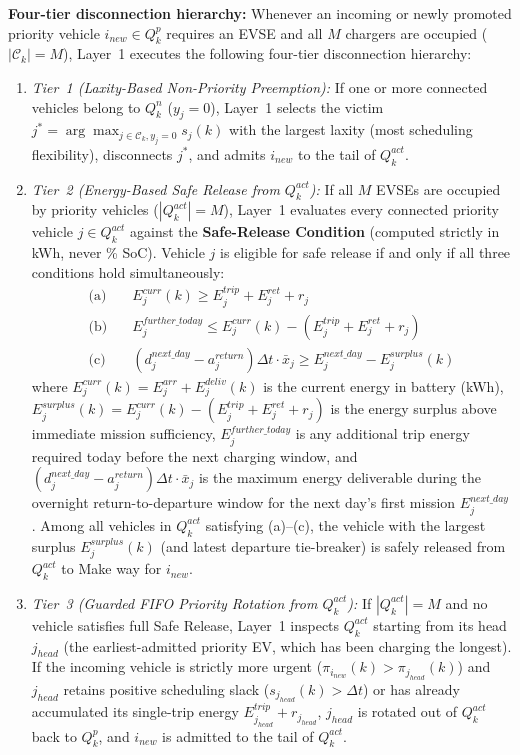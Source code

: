\documentclass[final,3p,times,twocolumn]{elsarticle}
\begin{document}
\textbf{Four-tier disconnection hierarchy:} Whenever an incoming or newly promoted priority vehicle $i_{new} \in Q_k^p$ requires an EVSE and all $M$ chargers are occupied ($|\mathcal{C}_k| = M$), Layer~1 executes the following four-tier disconnection hierarchy:
\begin{enumerate}
    \item \textit{Tier~1 (Laxity-Based Non-Priority Preemption):} If one or more connected vehicles belong to $Q_k^n$ ($y_j = 0$), Layer~1 selects the victim $j^* = \arg\max_{j \in \mathcal{C}_k, y_j=0} s_j(k)$ with the largest laxity (most scheduling flexibility), disconnects $j^*$, and admits $i_{new}$ to the tail of $Q_k^{act}$.
    \item \textit{Tier~2 (Energy-Based Safe Release from $Q_k^{act}$):} If all $M$ EVSEs are occupied by priority vehicles ($|Q_k^{act}| = M$), Layer~1 evaluates every connected priority vehicle $j \in Q_k^{act}$ against the \textbf{Safe-Release Condition} (computed strictly in kWh, never \% SoC). Vehicle $j$ is eligible for safe release if and only if all three conditions hold simultaneously:
    \begin{align}
        \text{(a)} \quad & E_j^{curr}(k) \ge E_j^{trip} + E_j^{ret} + r_j \label{eq:sr_a} \\
        \text{(b)} \quad & E_j^{further\_today} \le E_j^{curr}(k) - (E_j^{trip} + E_j^{ret} + r_j) \label{eq:sr_b} \\
        \text{(c)} \quad & (d_j^{next\_day} - a_j^{return})\Delta t \cdot \bar{x}_j \ge E_j^{next\_day} - E_j^{surplus}(k) \label{eq:sr_c}
    \end{align}
    where $E_j^{curr}(k) = E_j^{arr} + E_j^{deliv}(k)$ is the current energy in battery (kWh), $E_j^{surplus}(k) = E_j^{curr}(k) - (E_j^{trip} + E_j^{ret} + r_j)$ is the energy surplus above immediate mission sufficiency, $E_j^{further\_today}$ is any additional trip energy required today before the next charging window, and $(d_j^{next\_day} - a_j^{return})\Delta t \cdot \bar{x}_j$ is the maximum energy deliverable during the overnight return-to-departure window for the next day's first mission $E_j^{next\_day}$. Among all vehicles in $Q_k^{act}$ satisfying (a)--(c), the vehicle with the largest surplus $E_j^{surplus}(k)$ (and latest departure tie-breaker) is safely released from $Q_k^{act}$ to Make way for $i_{new}$.
    \item \textit{Tier~3 (Guarded FIFO Priority Rotation from $Q_k^{act}$):} If $|Q_k^{act}| = M$ and no vehicle satisfies full Safe Release, Layer~1 inspects $Q_k^{act}$ starting from its head $j_{head}$ (the earliest-admitted priority EV, which has been charging the longest). If the incoming vehicle is strictly more urgent ($\pi_{i_{new}}(k) > \pi_{j_{head}}(k)$) and $j_{head}$ retains positive scheduling slack ($s_{j_{head}}(k) > \Delta t$) or has already accumulated its single-trip energy $E_{j_{head}}^{trip} + r_{j_{head}}$, $j_{head}$ is rotated out of $Q_k^{act}$ back to $Q_k^p$, and $i_{new}$ is admitted to the tail of $Q_k^{act}$.

\end{enumerate}
\end{document}

